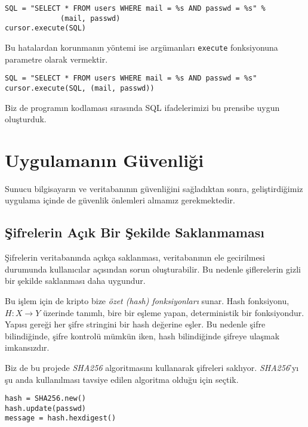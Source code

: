 \documentclass[11pt,a4paper]{report}
\begin{document}
\begin{lstlisting}[caption=Python-psycopg2 SQL Injection]
SQL = "SELECT * FROM users WHERE mail = %s AND passwd = %s" %
             (mail, passwd)
cursor.execute(SQL)
\end{lstlisting}

Bu hatalardan korunmanın yöntemi ise argümanları \texttt{execute} fonksiyonuna parametre olarak vermektir.

\begin{lstlisting}[caption=Python-psycopg2 SQL Injection]
SQL = "SELECT * FROM users WHERE mail = %s AND passwd = %s"
cursor.execute(SQL, (mail, passwd))
\end{lstlisting}

Biz de programın kodlaması sırasında SQL ifadelerimizi bu prensibe uygun oluşturduk.

\section{Uygulamanın Güvenliği}

Sunucu bilgisayarın ve veritabanının güvenliğini sağladıktan sonra, geliştirdiğimiz uygulama içinde de güvenlik önlemleri almamız gerekmektedir.

\subsection{Şifrelerin Açık Bir Şekilde Saklanmaması}

Şifrelerin veritabanında açıkça saklanması, veritabanının ele gecirilmesi durumunda kullanıcılar açısından sorun oluşturabilir. Bu nedenle şiflerelerin gizli bir şekilde saklanması daha uygundur.

Bu işlem için de kripto bize \emph{özet (hash) fonksiyonları} sunar. Hash fonksiyonu, $H: X \rightarrow Y$ üzerinde tanımlı, bire bir eşleme yapan, deterministik bir fonksiyondur. Yapısı gereği her şifre stringini bir hash değerine eşler. Bu nedenle şifre bilindiğinde, şifre kontrolü mümkün iken, hash bilindiğinde şifreye ulaşmak imkansızdır.

Biz de bu projede \emph{SHA256} algoritmasını kullanarak şifreleri saklıyor. \emph{SHA256}'yı şu anda kullanılması tavsiye edilen algoritma olduğu için seçtik.

\begin{lstlisting}[caption=Python SHA256 Kullanımı]
hash = SHA256.new()
hash.update(passwd)
message = hash.hexdigest()
\end{lstlisting}
\end{document}
